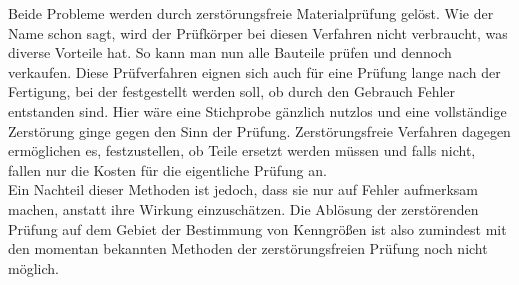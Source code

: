 \documentclass[reducespace,stylepage,semiarbeit]{spezidoc}
\begin{document}
Beide Probleme werden durch zerstörungsfreie Materialprüfung gelöst. Wie der Name schon sagt, wird der Prüfkörper bei diesen Verfahren nicht verbraucht, was diverse Vorteile hat. So kann man nun alle Bauteile prüfen und dennoch verkaufen. Diese Prüfverfahren eignen sich auch für eine Prüfung lange nach der Fertigung, bei der festgestellt werden soll, ob durch den Gebrauch Fehler entstanden sind. Hier wäre eine Stichprobe gänzlich nutzlos und eine vollständige Zerstörung ginge gegen den Sinn der Prüfung. Zerstörungsfreie Verfahren dagegen ermöglichen es, festzustellen, ob Teile ersetzt werden müssen und falls nicht, fallen nur die Kosten für die eigentliche Prüfung an.\\
Ein Nachteil dieser Methoden ist jedoch, dass sie nur auf Fehler aufmerksam machen, anstatt ihre Wirkung einzuschätzen. Die Ablösung der zerstörenden Prüfung auf dem Gebiet der Bestimmung von Kenngrößen ist also zumindest mit den momentan bekannten Methoden der zerstörungsfreien Prüfung noch nicht möglich.
\newpage
\end{document}

